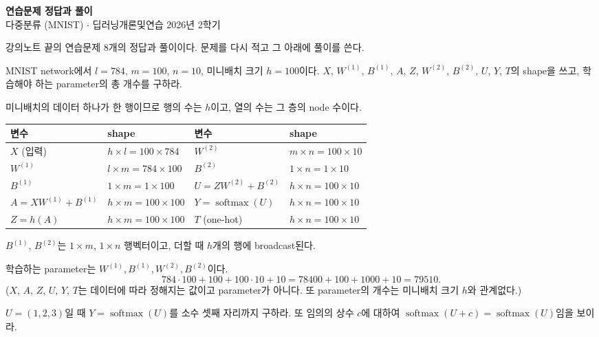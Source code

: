 \documentclass[11pt,a4paper]{article}
\newcommand{\softmax}{\operatorname{softmax}}
\begin{document}
\begin{center}
{\LARGE\bfseries 연습문제 정답과 풀이}\\[0.35em]
{\large 다중분류 (MNIST) $\cdot$ 딥러닝개론및연습 2026년 2학기}
\end{center}

강의노트 끝의 연습문제 8개의 정답과 풀이이다. 문제를 다시 적고 그 아래에 풀이를 쓴다.

\begin{problems}

\item MNIST network에서 $l=784$, $m=100$, $n=10$, 미니배치 크기 $h=100$이다.
$X$, $W^{(1)}$, $B^{(1)}$, $A$, $Z$, $W^{(2)}$, $B^{(2)}$, $U$, $Y$, $T$의 shape을 쓰고,
학습해야 하는 parameter의 총 개수를 구하라.

\begin{sol}
미니배치의 데이터 하나가 한 행이므로 행의 수는 $h$이고, 열의 수는 그 층의 node 수이다.
\begin{center}
\begin{tabular}{ll@{\qquad}ll}
\toprule
변수 & shape & 변수 & shape \\
\midrule
$X$ (입력) & $h\times l=100\times784$ & $W^{(2)}$ & $m\times n=100\times10$ \\
$W^{(1)}$ & $l\times m=784\times100$ & $B^{(2)}$ & $1\times n=1\times10$ \\
$B^{(1)}$ & $1\times m=1\times100$ & $U=ZW^{(2)}+B^{(2)}$ & $h\times n=100\times10$ \\
$A=XW^{(1)}+B^{(1)}$ & $h\times m=100\times100$ & $Y=\softmax(U)$ & $h\times n=100\times10$ \\
$Z=h(A)$ & $h\times m=100\times100$ & $T$ (one-hot) & $h\times n=100\times10$ \\
\bottomrule
\end{tabular}
\end{center}
$B^{(1)}$, $B^{(2)}$는 $1\times m$, $1\times n$ 행벡터이고, 더할 때 $h$개의 행에 broadcast된다.
\begin{center}
\end{center}
학습하는 parameter는 $W^{(1)},B^{(1)},W^{(2)},B^{(2)}$이다.
\[
784\cdot100+100+100\cdot10+10=78400+100+1000+10=\boxed{79510}.
\]
($X$, $A$, $Z$, $U$, $Y$, $T$는 데이터에 따라 정해지는 값이고 parameter가 아니다.
또 parameter의 개수는 미니배치 크기 $h$와 관계없다.)
\end{sol}

\item $U=(1,2,3)$일 때 $Y=\softmax(U)$를 소수 셋째 자리까지 구하라.
또 임의의 상수 $c$에 대하여 $\softmax(U+c)=\softmax(U)$임을 보이라.


\end{problems}
\end{document}
